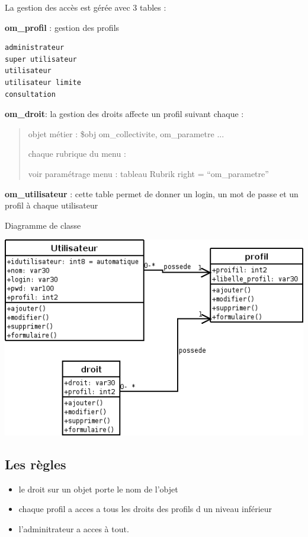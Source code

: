 \documentclass[letterpaper,10pt,french]{manual}
\begin{document}
La gestion des accès est gérée avec 3 tables :

\textbf{om\_profil} : gestion des profils

\begin{Verbatim}[commandchars=@\[\]]
administrateur
super utilisateur
utilisateur
utilisateur limite
consultation
\end{Verbatim}

\textbf{om\_droit}: la gestion des droits affecte un profil suivant chaque :
\begin{quote}

objet métier : \$obj om\_collectivite, om\_parametre ...

chaque rubrique du menu :

voir paramétrage menu : tableau Rubrik  right = ``om\_parametre''
\end{quote}

\textbf{om\_utilisateur} : cette table permet de donner un login, un mot de passe
et un profil à chaque utilisateur

Diagramme de classe

\includegraphics{acces_1.png}


\subsection{Les règles}
\begin{itemize}
\item {} 
le droit sur un objet porte le nom de l'objet

\item {} 
chaque profil a acces a tous les droits des profils d un niveau inférieur

\item {} 
l'adminitrateur a acces à tout.

\end{itemize}
\end{document}
